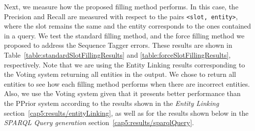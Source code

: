 Next, we measure how the proposed filling method performs. In this case, the Precision and Recall 
are measured with respect to the pairs \texttt{<slot, entity>}, where the slot remains the same 
and the entity corresponds to the ones contained in a \SPARQL{} query. We test the standard filling 
method, and the force filling method we proposed to address the Sequence Tagger errors. These 
results are shown in Table~\ref{table:standardSlotFillingResults} and \ref{table:forceSlotFillingResults}, 
respectively. Note that we are using the Entity Linking results corresponding to the Voting system 
returning all entities in the output. We chose to return all entities to see how each filling
method performs when there are incorrect entities. Also, we use the Voting system given that 
it presents better performance than the PPrior system according to the results shown in the 
\textit{Entity Linking} section~\ref{cap5:results/entityLinking}, as well as for the results shown 
below in the \textit{SPARQL Query generation} section~\ref{cap5:results/sparqlQuery}.

